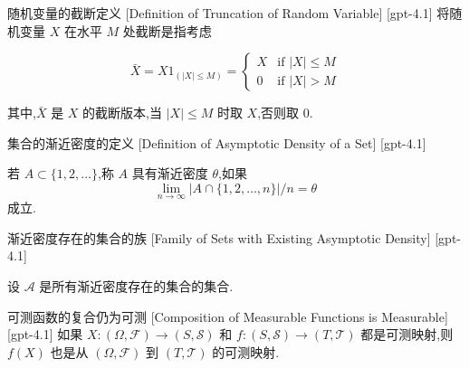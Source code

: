 \documentclass[UTF8]{ctexart}
\begin{document}
    
    
    \begin{dfn}
        {随机变量的截断定义}
        [Definition of Truncation of Random Variable]
        [gpt-4.1]
        将随机变量 $X$ 在水平 $M$ 处截断是指考虑

\[
\bar{X} = X 1_{(|X| \leq M)} = 
\begin{cases}
X & \text{if } |X| \leq M \\
0 & \text{if } |X| > M
\end{cases}
\]

其中,$\bar{X}$ 是 $X$ 的截断版本,当 $|X| \leq M$ 时取 $X$,否则取 $0$.

    \end{dfn}
    
    
    
    \begin{dfn}
        {集合的渐近密度的定义}
        [Definition of Asymptotic Density of a Set]
        [gpt-4.1]
        
若 $A \subset \{1, 2, \ldots\}$,称 $A$ 具有渐近密度 $\theta$,如果
\[
\operatorname*{lim}_{n \to \infty} |A \cap \{1, 2, \ldots, n\}| / n = \theta
\]
成立.

    \end{dfn}
    
    
    
    \begin{dfn}
        {渐近密度存在的集合的族}
        [Family of Sets with Existing Asymptotic Density]
        [gpt-4.1]
        
设 $\mathcal{A}$ 是所有渐近密度存在的集合的集合.

    \end{dfn}
    
    
    
    \begin{thm}
        {可测函数的复合仍为可测}
        [Composition of Measurable Functions is Measurable]
        [gpt-4.1]
        如果 $X : (\Omega, \mathcal{F}) \to (S, \mathcal{S})$ 和 $f : (S, \mathcal{S}) \to (T, \mathcal{T})$ 都是可测映射,则 $f(X)$ 也是从 $(\Omega, \mathcal{F})$ 到 $(T, \mathcal{T})$ 的可测映射.
    \end{thm}
    
    
    
\end{document}
